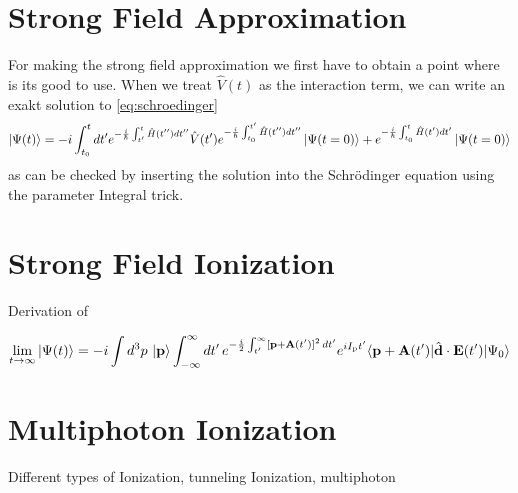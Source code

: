 \newpage
\section{Strong Field Approximation}

For making the strong field approximation we first have to obtain a point where is its good to use. 
When we treat $\hat{V}(t)$ as the interaction term, we can write an exakt solution to \eqref{eq:schroedinger}
\begin{equation}
    \ket{\Psi(t)} = -i \int_{t_0}^{t} dt' e^{-\frac{i}{\hbar} \int_{t'}^{t} \hat{H}(t'') dt''} \hat{V}(t') e^{-\frac{i}{\hbar} \int_{t_0}^{t'} \hat{H}(t'') dt''} \ket{\Psi(t=0)} + e^{-\frac{i}{\hbar} \int_{t_0}^{t} \hat{H}(t') dt'} \ket{\Psi(t=0)}
\end{equation}
as can be checked by inserting the solution into the Schrödinger equation using the parameter Integral trick.





\newpage
\section{Strong Field Ionization}

Derivation of 

\begin{equation}
    \lim_{t \to \infty} \ket{\Psi(t)}  = -i \int d^3 p\, \ket{\mathbf{p}} \int_{-\infty}^{\infty} dt'\, e^{-\frac{i}{2}\int_{t'}^{\infty} [\mathbf{p}+\mathbf{A}(t')]^2 \, dt'} e^{i I_\mathrm{p} t'} \langle \mathbf{p} + \mathbf{A}(t') | \hat{\mathbf{d}} \cdot \mathbf{E}(t') | \Psi_0 \rangle
\end{equation}





\newpage
\section{Multiphoton Ionization}

Different types of Ionization, tunneling Ionization, multiphoton
